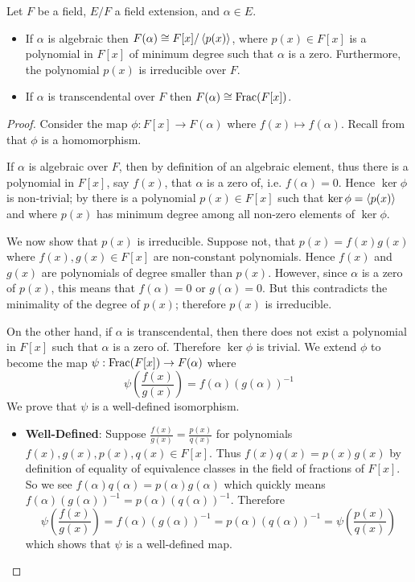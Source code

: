 \begin{theorem}\label{thrm-characterisation-of-extensions}
    Let $F$ be a field, $E/F$ a field extension, and $\alpha \in E$.
    \begin{itemize}
        \item If $\alpha$ is algebraic then $F(\alpha) \cong F[x]/\left\langle p(x)\right\rangle$, where $p(x) \in F[x]$ is a polynomial in $F[x]$ of minimum degree such that $\alpha$ is a zero. Furthermore, the polynomial $p(x)$ is irreducible over $F$.
        \item If $\alpha$ is transcendental over $F$ then $F(\alpha) \cong \mathrm{Frac}(F[x])$.
    \end{itemize}
\end{theorem}
\begin{proof}
    Consider the map $\phi: F[x] \to F(\alpha)$ where $f(x) \mapsto f(\alpha)$. Recall from  that $\phi$ is a homomorphism.

    If $\alpha$ is algebraic over $F$, then by definition of an algebraic element, thus there is a polynomial in $F[x]$, say $f(x)$, that $\alpha$ is a zero of, i.e. $f(\alpha) = 0$. Hence $\ker\phi$ is non-trivial; by  there is a polynomial $p(x) \in F[x]$ such that $\ker\phi = \left\langle p(x)\right\rangle$ and where $p(x)$ has minimum degree among all non-zero elements of $\ker\phi$.

    We now show that $p(x)$ is irreducible. Suppose not, that $p(x) = f(x)g(x)$ where $f(x), g(x) \in F[x]$ are non-constant polynomials. Hence $f(x)$ and $g(x)$ are polynomials of degree smaller than $p(x)$. However, since $\alpha$ is a zero of $p(x)$, this means that $f(\alpha) = 0$ or $g(\alpha) = 0$. But this contradicts the minimality of the degree of $p(x)$; therefore $p(x)$ is irreducible.

    On the other hand, if $\alpha$ is transcendental, then there does not exist a polynomial in $F[x]$ such that $\alpha$ is a zero of. Therefore $\ker\phi$ is trivial. We extend $\phi$ to become the map $\psi: \mathrm{Frac}(F[x]) \to F(\alpha)$ where
    \[
        \psi\left(\frac{f(x)}{g(x)}\right) = f(\alpha)(g(\alpha))^{-1}
    \]
    We prove that $\psi$ is a well-defined isomorphism.
    \begin{itemize}
        \item \textbf{Well-Defined}: Suppose $\frac{f(x)}{g(x)} = \frac{p(x)}{q(x)}$ for polynomials $f(x), g(x), p(x), q(x) \in F[x]$. Thus $f(x)q(x) = p(x)g(x)$ by definition of equality of equivalence classes in the field of fractions of $F[x]$. So we see $f(\alpha)q(\alpha) = p(\alpha)g(\alpha)$ which quickly means $f(\alpha)(g(\alpha))^{-1} = p(\alpha)(q(\alpha))^{-1}$. Therefore
        \[
            \psi\left(\frac{f(x)}{g(x)}\right) = f(\alpha)(g(\alpha))^{-1} = p(\alpha)(q(\alpha))^{-1} = \psi\left(\frac{p(x)}{q(x)}\right)
        \]
        which shows that $\psi$ is a well-defined map.


\end{itemize}
\end{proof}
